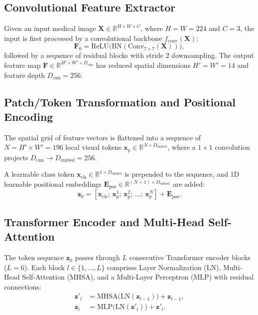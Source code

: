 \documentclass[conference]{IEEEtran}
\begin{document}
\subsection{Convolutional Feature Extractor}
Given an input medical image $\mathbf{X} \in \mathbb{R}^{H \times W \times C}$, where $H = W = 224$ and $C = 3$, the input is first processed by a convolutional backbone $f_{\text{conv}}(\mathbf{X})$:
\begin{equation}
\mathbf{F}_0 = \text{ReLU}\big(\text{BN}(\text{Conv}_{7\times7}(\mathbf{X}))\big),
\end{equation}
followed by a sequence of residual blocks with stride 2 downsampling. The output feature map $\mathbf{F} \in \mathbb{R}^{H' \times W' \times D_{\text{cnn}}}$ has reduced spatial dimensions $H' = W' = 14$ and feature depth $D_{\text{cnn}} = 256$.

\subsection{Patch/Token Transformation and Positional Encoding}
The spatial grid of feature vectors is flattened into a sequence of $N = H' \times W' = 196$ local visual tokens $\mathbf{x}_p \in \mathbb{R}^{N \times D_{\text{embed}}}$, where a $1 \times 1$ convolution projects $D_{\text{cnn}} \to D_{\text{embed}} = 256$.

A learnable class token $\mathbf{x}_{\text{cls}} \in \mathbb{R}^{1 \times D_{\text{embed}}}$ is prepended to the sequence, and 1D learnable positional embeddings $\mathbf{E}_{\text{pos}} \in \mathbb{R}^{(N+1) \times D_{\text{embed}}}$ are added:
\begin{equation}
\mathbf{z}_0 = \left[ \mathbf{x}_{\text{cls}};\, \mathbf{x}_p^1;\, \mathbf{x}_p^2;\, \dots;\, \mathbf{x}_p^N \right] + \mathbf{E}_{\text{pos}}.
\end{equation}

\subsection{Transformer Encoder and Multi-Head Self-Attention}
The token sequence $\mathbf{z}_0$ passes through $L$ consecutive Transformer encoder blocks ($L = 6$). Each block $l \in \{1, \dots, L\}$ comprises Layer Normalization ($\text{LN}$), Multi-Head Self-Attention ($\text{MHSA}$), and a Multi-Layer Perceptron ($\text{MLP}$) with residual connections:
\begin{align}
\mathbf{z}'_l &= \text{MHSA}\big(\text{LN}(\mathbf{z}_{l-1})\big) + \mathbf{z}_{l-1}, \\
\mathbf{z}_l &= \text{MLP}\big(\text{LN}(\mathbf{z}'_l)\big) + \mathbf{z}'_l.
\end{align}
\end{document}

